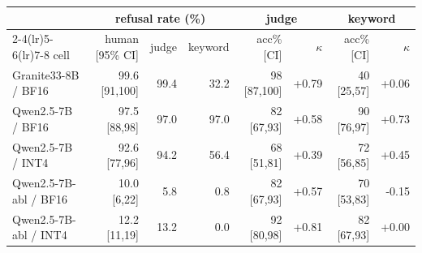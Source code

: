 \setlength{\tabcolsep}{3pt}
\begin{tabular}{@{}l r r r r r r r@{}}
\toprule
& \multicolumn{3}{c}{refusal rate (\%)} & \multicolumn{2}{c}{judge} & \multicolumn{2}{c}{keyword} \\
\cmidrule(lr){2-4}\cmidrule(lr){5-6}\cmidrule(lr){7-8}
cell & human [95\% CI] & judge & keyword & acc\% [CI] & $\kappa$ & acc\% [CI] & $\kappa$ \\
\midrule
Granite33-8B / BF16 & 99.6 [91,100] & 99.4 & 32.2 & 98 [87,100] & +0.79 & 40 [25,57] & +0.06 \\
Qwen2.5-7B / BF16 & 97.5 [88,98] & 97.0 & 97.0 & 82 [67,93] & +0.58 & 90 [76,97] & +0.73 \\
Qwen2.5-7B / INT4 & 92.6 [77,96] & 94.2 & 56.4 & 68 [51,81] & +0.39 & 72 [56,85] & +0.45 \\
Qwen2.5-7B-abl / BF16 & 10.0 [6,22] & 5.8 & 0.8 & 82 [67,93] & +0.57 & 70 [53,83] & -0.15 \\
Qwen2.5-7B-abl / INT4 & 12.2 [11,19] & 13.2 & 0.0 & 92 [80,98] & +0.81 & 82 [67,93] & +0.00 \\
\bottomrule
\end{tabular}
